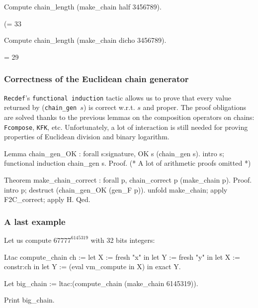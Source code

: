 \begin{Coqsrc}
Compute chain_length (make_chain half 3456789).
\end{Coqsrc}

\begin{Coqanswer}
(= 33%
\end{Coqanswer}

\begin{Coqsrc}
Compute chain_length (make_chain dicho 3456789).
\end{Coqsrc}

\begin{Coqanswer}
= 29%
\end{Coqanswer}


\subsubsection{Correctness of the Euclidean chain generator}

\texttt{Recdef}'s \texttt{functional induction} tactic allows us to
prove that every value returned by (\texttt{chain\_gen $s$}) is correct w.r.t. 
\texttt{$s$} and proper.
The proof obligations are solved thanks to the previous lemmas on 
the composition operators on chains: \texttt{Fcompose}, \texttt{KFK}, etc.
Unfortunately, a lot of interaction is still needed for proving properties of
Euclidean division and binary logarithm. 



\begin{Coqsrc}
Lemma chain_gen_OK : forall s:signature, OK  s (chain_gen  s).
intro s; functional induction chain_gen s.
Proof.
(* A lot of arithmetic proofs omitted *)

Theorem make_chain_correct :
    forall p, chain_correct p (make_chain p).
Proof.
 intro p; destruct (chain_gen_OK (gen_F p)).
 unfold make_chain; apply F2C_correct; apply H.
Qed.
\end{Coqsrc}

\subsubsection{A last example}
\label{ex45319}

Let us compute  $67777^{6145319}$ with 32 bits integers:

\begin{Coqsrc}

Ltac compute_chain ch := 
   let X := fresh "x" in 
   let Y := fresh "y" in
   let X := constr:ch in 
   let Y := (eval vm_compute in X) in 
   exact Y.

Let big_chain := ltac:(compute_chain  (make_chain 6145319)).

Print big_chain.
\end{Coqsrc}


